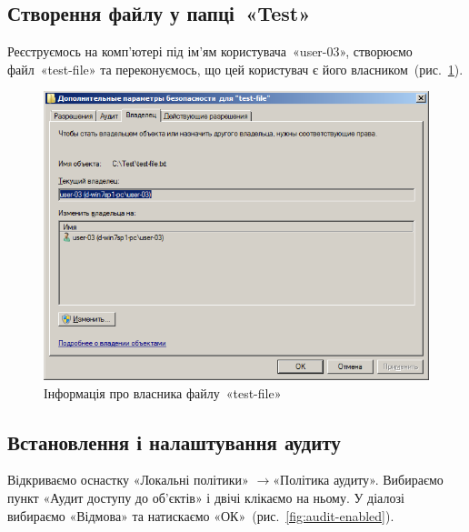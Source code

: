 \documentclass[
	a4paper,
	oneside,
	DIV = 12,
	fontsize = 13pt,
	headings = normal,
]{scrartcl}
\newcommand{\Mytextrightarrow}{$\rightarrow$\hspace{0.25em}}
\begin{document}
		\subsection{Створення файлу у папці~«\textenglish{Test}»}
			Реєструємось на комп'ютері під ім'ям користувача~«\textenglish{user-03}», створюємо файл~«\textenglish{test-file}» та переконуємось, що цей користувач є його власником~(рис.~\ref{fig:test-file-owner}).

			\begin{figure}[!htbp]
				\centering
				\includegraphics[height = 12\baselineskip]{../01-solution/y03s01-pcdiag-lab-08-p16.png}
				\caption{Інформація про власника файлу~«\textenglish{test-file}»}
				\label{fig:test-file-owner}
			\end{figure}

		\subsection{Встановлення і налаштування аудиту}
			Відкриваємо оснастку «Локальні політики» \Mytextrightarrow «Політика аудиту». Вибираємо пункт «Аудит доступу до об'єктів» і двічі клікаємо на ньому. У діалозі вибираємо «Відмова» та натискаємо «ОК»~(рис.~\ref{fig:audit-enabled}).
\end{document}

